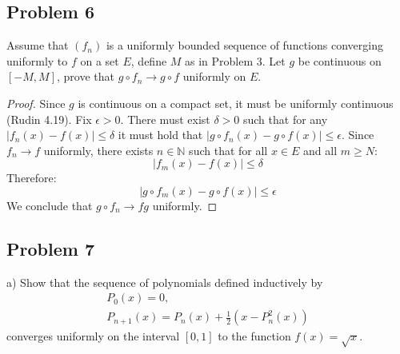 \documentclass{article}
\begin{document}
\subsection*{Problem 6}

\begin{tcolorbox}
Assume that $(f_n)$ is a uniformly bounded sequence of functions converging uniformly to $f$ on a set $E$, define $M$ as in Problem 3.
Let $g$ be continuous on $[-M, M]$, prove that $g \circ f_n \to g \circ f$ uniformly on $E$.
\end{tcolorbox}

\begin{proof}

Since $g$ is continuous on a compact set, it must be uniformly continuous (Rudin 4.19).
Fix $\epsilon>0$. There must exist $\delta>0$ such that for any $|f_n(x)-f(x)| \leq \delta$ it must hold that $|g \circ f_n(x)-g \circ f(x)| \leq \epsilon$.
Since $f_n \to f$ uniformly, there exists $n \in \mathbb{N}$ such that for all $x \in E$ and all $m \geq N$:
\[ |f_m(x)-f(x)| \leq \delta \]
Therefore:
\[ |g \circ f_m(x)-g \circ f(x)| \leq \epsilon \]
We conclude that $g \circ f_n \to f g$ uniformly.
\end{proof}


\subsection*{Problem 7}

\begin{tcolorbox}
a) Show that the sequence of polynomials defined inductively by
\begin{gather*}
    P_0(x) = 0, \\
    P_{n+1}(x) = P_n(x) + \frac{1}{2} \left( x-P_n^2(x) \right)    
\end{gather*}
converges uniformly on the interval $[0, 1]$ to the function $f(x) = \sqrt{x}$.
\end{tcolorbox}
\end{document}
